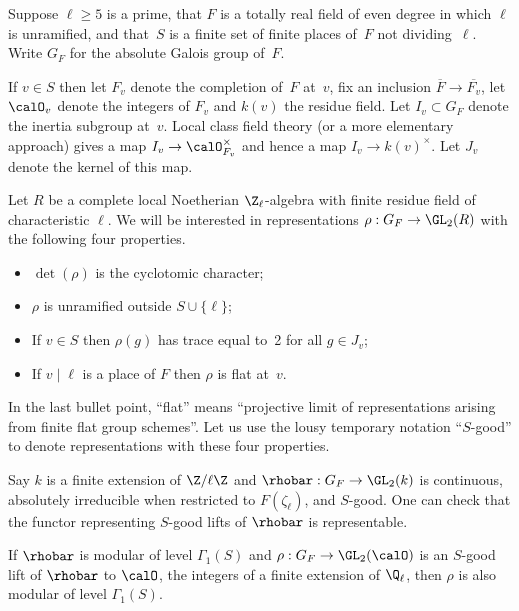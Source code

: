 Suppose $\ell\geq5$ is a prime, that $F$ is a totally real field of even degree in which $\ell$
is unramified, and that~$S$ is a finite set of finite places of~$F$ not dividing~$\ell$. Write
$G_F$ for the absolute Galois group of~$F$.

If $v\in S$ then let $F_v$ denote the completion of~$F$ at~$v$, fix an inclusion $\overline{F}\to\overline{F_v}$,
let $\calO_v$ denote the integers of $F_v$ and $k(v)$ the residue field. Let $I_v\subset G_F$ denote the inertia
subgroup at~$v$. Local class field theory (or a more elementary approach) gives a map $I_v\to\calO_{F_v}^\times$
and hence a map $I_v\to k(v)^\times$. Let $J_v$ denote the kernel of this map.

Let $R$ be a complete local Noetherian $\Z_\ell$-algebra with finite residue field of characteristic $\ell$.
We will be interested in representations $\rho:G_F\to\GL_2(R)$ with the following four properties.
\begin{itemize}
    \item $\det(\rho)$ is the cyclotomic character;
    \item $\rho$ is unramified outside $S\cup\{\ell\}$;
    \item If $v\in S$ then $\rho(g)$ has trace equal to~2 for all $g\in J_v$;
    \item If $v\mid\ell$ is a place of $F$ then $\rho$ is flat at~$v$.
\end{itemize}

In the last bullet point, ``flat'' means ``projective limit of representations arising from
finite flat group schemes''. Let us use the lousy temporary notation ``$S$-good'' to denote
representations with these four properties.

Say $k$ is a finite extension of $\Z/\ell\Z$ and $\rhobar:G_F\to\GL_2(k)$ is continuous,
absolutely irreducible when restricted to $F(\zeta_\ell)$, and $S$-good. One can check
that the functor representing $S$-good lifts of $\rhobar$ is representable.

\begin{theorem}
    \label{modularity_lifting_theorem}
      \notready
        If $\rhobar$ is modular of level $\Gamma_1(S)$ and $\rho:G_F\to\GL_2(\calO)$ is
        an $S$-good lift of $\rhobar$ to $\calO$, the integers of a finite extension of $\Q_\ell$,
        then $\rho$ is also modular of level $\Gamma_1(S)$.
\end{theorem}

